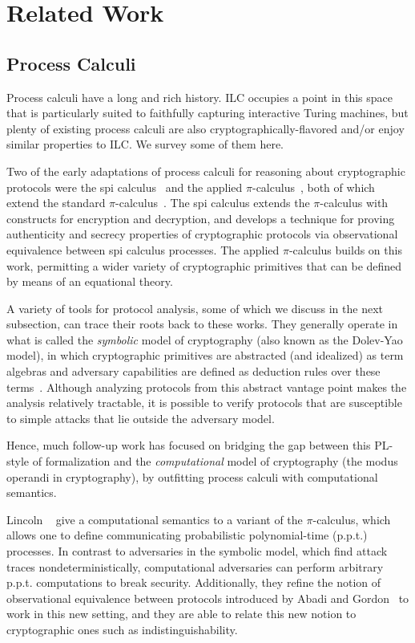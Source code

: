 \section{Related Work}
\label{sec:related}

\subsection{Process Calculi}
\label{subsec:process-calculi}

Process calculi have a long and rich history. ILC occupies a point in this space
that is particularly suited to faithfully capturing interactive Turing machines,
but plenty of existing process calculi are also cryptographically-flavored
and/or enjoy similar properties to ILC. We survey some of them here.

Two of the early adaptations of process calculi for reasoning about
cryptographic protocols were the spi calculus~\cite{abadi1999calculus} and the
applied $\pi$-calculus~\cite{abadi2001mobile}, both of which extend the standard
$\pi$-calculus~\cite{milner1999communicating}. The spi calculus extends the
$\pi$-calculus with constructs for encryption and decryption, and develops a
technique for proving authenticity and secrecy properties of cryptographic
protocols via observational equivalence between spi calculus processes. The
applied $\pi$-calculus builds on this work, permitting a wider variety of
cryptographic primitives that can be defined by means of an equational theory.

A variety of tools for protocol analysis, some of which we discuss in the next
subsection, can trace their roots back to these works. They generally operate in
what is called the \emph{symbolic} model of cryptography (also known as the
Dolev-Yao model), in which cryptographic primitives are abstracted (and
idealized) as term algebras and adversary capabilities are defined as deduction
rules over these terms~\cite{cortier2011survey}. Although analyzing protocols
from this abstract vantage point makes the analysis relatively tractable, it is
possible to verify protocols that are susceptible to simple attacks that lie
outside the adversary model.

Hence, much follow-up work has focused on bridging the gap between this PL-style
of formalization and the \emph{computational} model of cryptography (the modus
operandi in cryptography), by outfitting process calculi with computational
semantics.

Lincoln \etal~\cite{lincoln1998probabilistic} give a computational semantics to
a variant of the $\pi$-calculus, which allows one to define communicating
probabilistic polynomial-time (p.p.t.) processes. In contrast to adversaries in
the symbolic model, which find attack traces nondeterministically, computational
adversaries can perform arbitrary p.p.t. computations to break
security. Additionally, they refine the notion of observational equivalence
between protocols introduced by Abadi and Gordon~\cite{abadi1999calculus} to
work in this new setting, and they are able to relate this new notion to
cryptographic ones such as indistinguishability.


